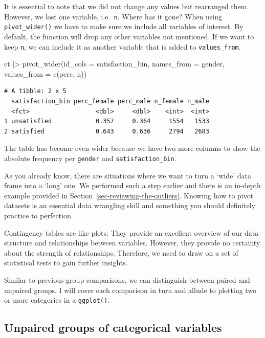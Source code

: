 \documentclass[
  letterpaper,
  DIV=11,
  numbers=noendperiod]{scrreprt}
\newenvironment{Shaded}{\begin{snugshade}}{\end{snugshade}}
\newcommand{\AttributeTok}[1]{\textcolor[rgb]{0.40,0.45,0.13}{#1}}
\newcommand{\FunctionTok}[1]{\textcolor[rgb]{0.28,0.35,0.67}{#1}}
\newcommand{\NormalTok}[1]{\textcolor[rgb]{0.00,0.23,0.31}{#1}}
\newcommand{\SpecialCharTok}[1]{\textcolor[rgb]{0.37,0.37,0.37}{#1}}
\begin{document}
It is essential to note that we did not change any values but rearranged
them. However, we lost one variable, i.e.~\texttt{n}. Where has it gone?
When using \texttt{pivot\_wider()} we have to make sure we include all
variables of interest. By default, the function will drop any other
variables not mentioned. If we want to keep \texttt{n}, we can include
it as another variable that is added to \texttt{values\_from}.

\begin{Shaded}
\begin{Highlighting}[]
\NormalTok{ct }\SpecialCharTok{|\textgreater{}} \FunctionTok{pivot\_wider}\NormalTok{(}\AttributeTok{id\_cols =}\NormalTok{ satisfaction\_bin,}
                   \AttributeTok{names\_from =}\NormalTok{ gender,}
                   \AttributeTok{values\_from =} \FunctionTok{c}\NormalTok{(perc, n))}
\end{Highlighting}
\end{Shaded}

\begin{verbatim}
# A tibble: 2 x 5
  satisfaction_bin perc_female perc_male n_female n_male
  <fct>                  <dbl>     <dbl>    <int>  <int>
1 unsatisfied            0.357     0.364     1554   1533
2 satisfied              0.643     0.636     2794   2683
\end{verbatim}

The table has become even wider because we have two more columns to show
the absolute frequency per \texttt{gender} and
\texttt{satisfaction\_bin}.

As you already know, there are situations where we want to turn a `wide'
data frame into a `long' one. We performed such a step earlier and there
is an in-depth example provided in
Section~\ref{sec-reviewing-the-outliers}. Knowing how to pivot datasets
is an essential data wrangling skill and something you should definitely
practice to perfection.

Contingency tables are like plots: They provide an excellent overview of
our data structure and relationships between variables. However, they
provide no certainty about the strength of relationships. Therefore, we
need to draw on a set of statistical tests to gain further insights.

Similar to previous group comparisons, we can distinguish between paired
and unpaired groups. I will cover each comparison in turn and allude to
plotting two or more categories in a \texttt{ggplot()}.

\subsection{Unpaired groups of categorical
variables}\label{sec-unpaired-groups-categorical-variables}
\end{document}
